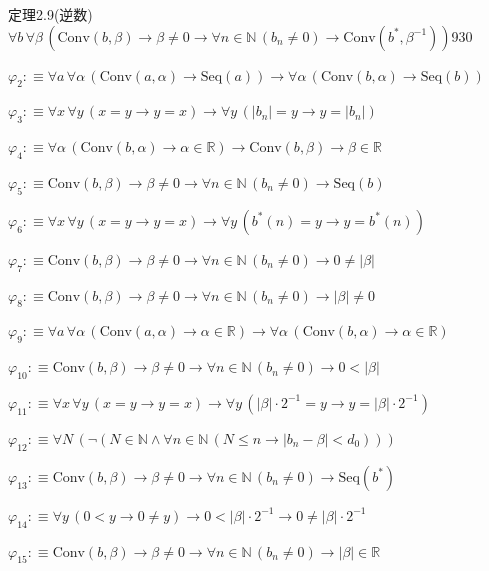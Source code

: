 \begin{fullproof}{定理2.9(逆数)}{$\forall b\,\forall \beta\,(\mathrm{Conv}(b,\beta) \to \beta \neq 0 \to \forall n \in \mathbb{N}\,(b_{n} \neq 0) \to \mathrm{Conv}(b^{\ast},\beta^{-1}))$}{930}
\begin{abbrevlist}
\item $\varphi_{2} :\equiv \forall a\,\forall \alpha\,(\mathrm{Conv}(a,\alpha) \to \mathrm{Seq}(a)) \to \forall \alpha\,(\mathrm{Conv}(b,\alpha) \to \mathrm{Seq}(b))$
\item $\varphi_{3} :\equiv \forall x\,\forall y\,(x = y \to y = x) \to \forall y\,(\lvert b_{n} \rvert = y \to y = \lvert b_{n} \rvert)$
\item $\varphi_{4} :\equiv \forall \alpha\,(\mathrm{Conv}(b,\alpha) \to \alpha \in \mathbb{R}) \to \mathrm{Conv}(b,\beta) \to \beta \in \mathbb{R}$
\item $\varphi_{5} :\equiv \mathrm{Conv}(b,\beta) \to \beta \neq 0 \to \forall n \in \mathbb{N}\,(b_{n} \neq 0) \to \mathrm{Seq}(b)$
\item $\varphi_{6} :\equiv \forall x\,\forall y\,(x = y \to y = x) \to \forall y\,(b^{\ast}(n) = y \to y = b^{\ast}(n))$
\item $\varphi_{7} :\equiv \mathrm{Conv}(b,\beta) \to \beta \neq 0 \to \forall n \in \mathbb{N}\,(b_{n} \neq 0) \to 0 \neq \lvert \beta \rvert$
\item $\varphi_{8} :\equiv \mathrm{Conv}(b,\beta) \to \beta \neq 0 \to \forall n \in \mathbb{N}\,(b_{n} \neq 0) \to \lvert \beta \rvert \neq 0$
\item $\varphi_{9} :\equiv \forall a\,\forall \alpha\,(\mathrm{Conv}(a,\alpha) \to \alpha \in \mathbb{R}) \to \forall \alpha\,(\mathrm{Conv}(b,\alpha) \to \alpha \in \mathbb{R})$
\item $\varphi_{10} :\equiv \mathrm{Conv}(b,\beta) \to \beta \neq 0 \to \forall n \in \mathbb{N}\,(b_{n} \neq 0) \to 0 < \lvert \beta \rvert$
\item $\varphi_{11} :\equiv \forall x\,\forall y\,(x = y \to y = x) \to \forall y\,(\lvert \beta \rvert \cdot 2^{-1} = y \to y = \lvert \beta \rvert \cdot 2^{-1})$
\item $\varphi_{12} :\equiv \forall N\,(\neg (N \in \mathbb{N} \land \forall n \in \mathbb{N}\,(N \leq n \to \lvert b_{n} - \beta \rvert < d_{0})))$
\item $\varphi_{13} :\equiv \mathrm{Conv}(b,\beta) \to \beta \neq 0 \to \forall n \in \mathbb{N}\,(b_{n} \neq 0) \to \mathrm{Seq}(b^{\ast})$
\item $\varphi_{14} :\equiv \forall y\,(0 < y \to 0 \neq y) \to 0 < \lvert \beta \rvert \cdot 2^{-1} \to 0 \neq \lvert \beta \rvert \cdot 2^{-1}$
\item $\varphi_{15} :\equiv \mathrm{Conv}(b,\beta) \to \beta \neq 0 \to \forall n \in \mathbb{N}\,(b_{n} \neq 0) \to \lvert \beta \rvert \in \mathbb{R}$

\end{abbrevlist}
\end{fullproof}

